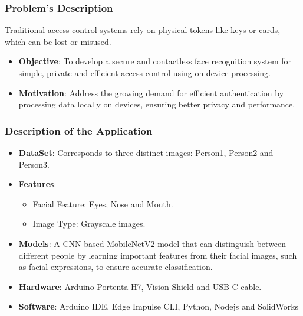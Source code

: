 %
%
%


\begin{frame}
	\frametitle{Problem's Description}
	
	\begin{block}{}
		Traditional access control systems rely on physical tokens like keys or cards, which can be lost or misused.
		\begin{itemize}
			\item \textbf{Objective}: To develop a secure and contactless face recognition system for simple, private and efficient access control using on-device processing.
			
			\item \textbf{Motivation}: Address the growing demand for efficient authentication by processing data locally on devices, ensuring better privacy and performance.
			
		\end{itemize}
	\end{block}
	
\end{frame}



\begin{frame}
	
	
	\frametitle{Description of the Application}
	
	\begin{block}{}
		
		\begin{itemize}
			\item \textbf{DataSet}: Corresponds to three distinct images: Person1, Person2 and Person3.
			\item \textbf{Features}: 
			\begin{itemize}
				\item Facial Feature: Eyes, Nose and Mouth.
				\item Image Type: Grayscale images.
			\end{itemize}
			\item \textbf{Models}:  A CNN-based MobileNetV2 model that can distinguish between different people by learning important features from their facial images, such as facial expressions, to ensure accurate classification.
			\item \textbf{Hardware}: Arduino Portenta H7, Vision Shield and USB-C cable.
			\item \textbf{Software}: Arduino IDE, Edge Impulse CLI, Python, Nodejs and SolidWorks
		\end{itemize}
	\end{block}
	
\end{frame}

